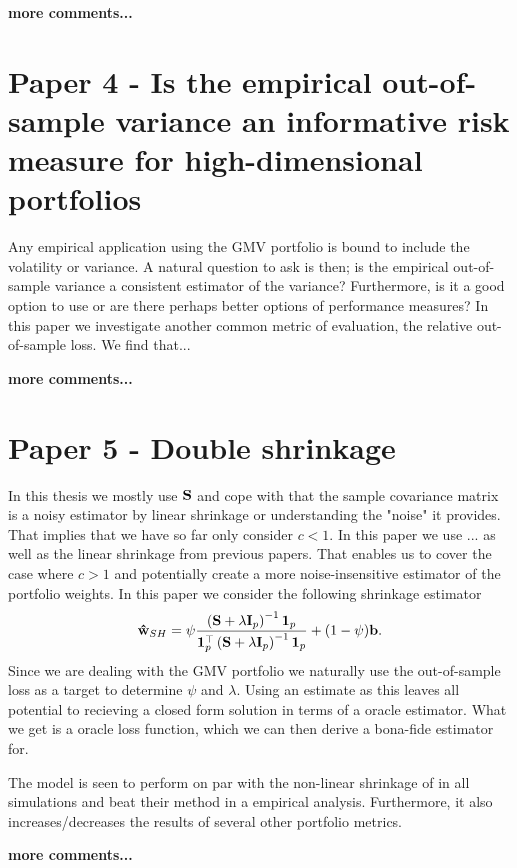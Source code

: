 \documentclass[oneside]{book}\usepackage{knitr}
\begin{document}
\textbf{more comments...}
\section{Paper 4 - Is the empirical out-of-sample variance an informative risk measure for high-dimensional portfolios}\label{sec:paper4}
Any empirical application using the GMV portfolio is bound to include the volatility or variance. 
A natural question to ask is then; is the empirical out-of-sample variance a consistent estimator of the variance? 
Furthermore, is it a good option to use or are there perhaps better options of performance measures? 
In this paper we investigate another common metric of evaluation, the relative out-of-sample loss.   
We find that...

\textbf{more comments...}
\section{Paper 5 - Double shrinkage}\label{sec:paper5}
In this thesis we mostly use $\mathbf{S}$ and cope with that the sample covariance matrix is a noisy estimator by linear shrinkage or understanding the "noise" it provides.
That implies that we have so far only consider $c<1$.
In this paper we use ... as well as the linear shrinkage from previous papers. 
That enables us to cover the case where $c>1$ and potentially create a more noise-insensitive estimator of the portfolio weights.
In this paper we consider the following shrinkage estimator
$$
\mathbf{\hat{w}}_{SH} = \psi \frac{\left(\mathbf{S} + \lambda \mathbf{I}_p \right)^{-1}\mathbf{1}_p}{\mathbf{1}_p^\top\left(\mathbf{S} + \lambda \mathbf{I}_p \right)^{-1}\mathbf{1}_p} + (1-\psi)\mathbf{b}.
$$
Since we are dealing with the GMV portfolio we naturally use the out-of-sample loss as a target to determine $\psi$ and $\lambda$.
Using an estimate as this leaves all potential to recieving a closed form solution in terms of a oracle estimator.
What we get is a oracle loss function, which we can then derive a bona-fide estimator for.

The model is seen to perform on par with the non-linear shrinkage of \citet{lw20} in all simulations and beat their method in a empirical analysis.
Furthermore, it also increases/decreases the results of several other portfolio metrics.

\textbf{more comments...}
\end{document}
